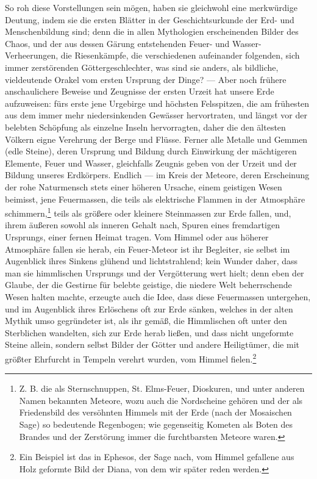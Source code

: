\documentclass[a4paper, 11pt, oneside, polutonikogreek, german]{article}
\begin{document}
So roh diese Vorstellungen sein mögen, haben sie gleichwohl eine merkwürdige Deutung, indem sie die ersten Blätter in der Geschichtsurkunde der Erd- und Menschenbildung sind; denn die in allen Mythologien erscheinenden Bilder des Chaos, und der aus dessen Gärung entstehenden Feuer- und Wasser-Verheerungen, die Riesenkämpfe, die verschiedenen aufeinander folgenden, sich immer zerstörenden Göttergeschlechter, was sind sie anders, als bildliche, vieldeutende Orakel vom ersten Ursprung der Dinge? --- Aber noch frühere anschaulichere Beweise und Zeugnisse der ersten Urzeit hat unsere Erde aufzuweisen: fürs erste jene Urgebirge und höchsten Felsspitzen, die am frühesten aus dem immer mehr niedersinkenden Gewässer hervortraten, und längst vor der belebten Schöpfung als einzelne Inseln hervorragten, daher die den ältesten Völkern eigne Verehrung der Berge und Flüsse. Ferner alle Metalle und Gemmen (edle Steine), deren Ursprung und Bildung durch Einwirkung der mächtigeren Elemente, Feuer und Wasser, gleichfalls Zeugnis geben von der Urzeit und der Bildung unseres Erdkörpers. Endlich --- im Kreis der Meteore, deren Erscheinung der rohe Naturmensch stets einer höheren Ursache, einem geistigen Wesen beimisst, jene Feuermassen, die teils als elektrische Flammen in der Atmosphäre schimmern,\footnote{Z. B. die als Sternschnuppen, St. Elms-Feuer, Dioskuren, und unter anderen Namen bekannten Meteore, wozu auch die Nordscheine gehören und der als Friedensbild des versöhnten Himmels mit der Erde (nach der Mosaischen Sage) so bedeutende Regenbogen; wie gegenseitig Kometen als Boten des Brandes und der Zerstörung immer die furchtbarsten Meteore waren.} teils als größere oder kleinere Steinmassen zur Erde fallen, und, ihrem äußeren sowohl als inneren Gehalt nach, Spuren eines fremdartigen Ursprungs, einer fernen Heimat tragen. Vom Himmel oder aus höherer Atmosphäre fallen sie herab, ein Feuer-Meteor ist ihr Begleiter, sie selbst im Augenblick ihres Sinkens glühend und lichtstrahlend; kein Wunder daher, dass man sie himmlischen Ursprungs und der Vergötterung wert hielt; denn eben der Glaube, der die Gestirne für belebte geistige, die niedere Welt beherrschende Wesen halten machte, erzeugte auch die Idee, dass diese Feuermassen untergehen, und im Augenblick ihres Erlöschens oft zur Erde sänken, welches in der alten Mythik umso gegründeter ist, als ihr gemäß, die Himmlischen oft unter den Sterblichen wandelten, sich zur Erde herab ließen, und dass nicht ungeformte Steine allein, sondern selbst Bilder der Götter und andere Heiligtümer, die mit größter Ehrfurcht in Tempeln verehrt wurden, vom Himmel fielen.\footnote{Ein Beispiel ist das in Ephesos, der Sage nach, vom Himmel gefallene aus Holz geformte Bild der Diana, von dem wir später reden werden.}
\end{document}
